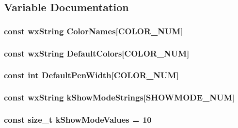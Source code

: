 \subsection{Variable Documentation}
\hypertarget{a00191_a7acbbf3434fafe32a73716825cf271aa}{
\subsubsection[{Color\-Names}]{\setlength{\rightskip}{0pt plus 5cm}const wx\-String Color\-Names\mbox{[}{\bf C\-O\-L\-O\-R\-\_\-\-N\-U\-M}\mbox{]}}}\label{a00191_a7acbbf3434fafe32a73716825cf271aa}
\hypertarget{a00191_a3076b2817e7f19e5cc9e208cb9d4d800}{
\subsubsection[{Default\-Colors}]{\setlength{\rightskip}{0pt plus 5cm}const wx\-String Default\-Colors\mbox{[}{\bf C\-O\-L\-O\-R\-\_\-\-N\-U\-M}\mbox{]}}}\label{a00191_a3076b2817e7f19e5cc9e208cb9d4d800}
\hypertarget{a00191_a88920aef299a66dd1f54a17d60872bb0}{
\subsubsection[{Default\-Pen\-Width}]{\setlength{\rightskip}{0pt plus 5cm}const int Default\-Pen\-Width\mbox{[}{\bf C\-O\-L\-O\-R\-\_\-\-N\-U\-M}\mbox{]}}}\label{a00191_a88920aef299a66dd1f54a17d60872bb0}
\hypertarget{a00191_a022c27d9633256775696f727390f8d65}{
\subsubsection[{k\-Show\-Mode\-Strings}]{\setlength{\rightskip}{0pt plus 5cm}const wx\-String k\-Show\-Mode\-Strings\mbox{[}{\bf S\-H\-O\-W\-M\-O\-D\-E\-\_\-\-N\-U\-M}\mbox{]}}}\label{a00191_a022c27d9633256775696f727390f8d65}
\hypertarget{a00191_a9f04f33b4133efadaca3371489a3e3e0}{
\subsubsection[{k\-Show\-Mode\-Values}]{\setlength{\rightskip}{0pt plus 5cm}const size\-\_\-t k\-Show\-Mode\-Values = 10}}\label{a00191_a9f04f33b4133efadaca3371489a3e3e0}
